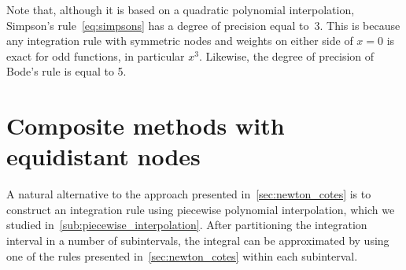 Note that,
although it is based on a quadratic polynomial interpolation,
Simpson's rule~\eqref{eq:simpsons} has a degree of precision equal to~$3$.
This is because any integration rule with symmetric nodes and weights on either side of $x=0$ is exact for odd functions,
in particular $x^3$.
Likewise, the degree of precision of Bode's rule is equal to 5.

\section{Composite methods with equidistant nodes}
\label{sec:composite_methods}
A natural alternative to the approach presented in~\cref{sec:newton_cotes}
is to construct an integration rule using piecewise polynomial interpolation,
which we studied in~\cref{sub:piecewise_interpolation}.
After partitioning the integration interval in a number of subintervals,
the integral can be approximated by using one of the rules presented in~\eqref{sec:newton_cotes} within each subinterval.

